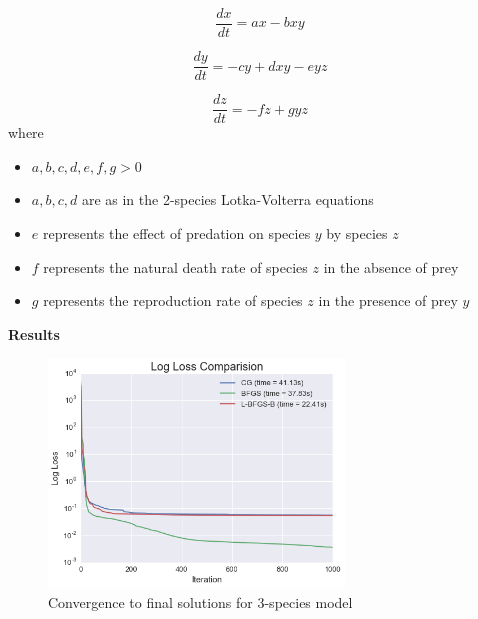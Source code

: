 \documentclass[11pt]{article}
\begin{document}
    \begin{equation}
      \frac{dx}{dt} = ax - bxy
      \label{eq:LV3}
    \end{equation}
    
     \begin{equation}
      \frac{dy}{dt} = - cy + dxy - eyz
      \label{eq:LV4}
    \end{equation}
    
     \begin{equation}
      \frac{dz}{dt} = - fz + gyz
      \label{eq:LV5}
    \end{equation}
where
\begin{itemize}
\item $a, b, c, d, e, f, g >0$ 
\item $a, b, c, d$ are as in the 2-species Lotka-Volterra equations
\item $e$ represents the effect of predation on species $y$ by species $z$
\item $f$ represents the natural death rate of species $z$ in the absence of prey
\item $g$ represents the reproduction rate of species $z$ in the presence of prey $y$
\end{itemize}

\textbf{Results}


\begin{figure}
\centering
\includegraphics[width=0.7\textwidth]{lossMethod_LV3.png}
      \caption{Convergence to final solutions for 3-species model \label{fig:loss_LV3}}
\end{figure}
\end{document}
